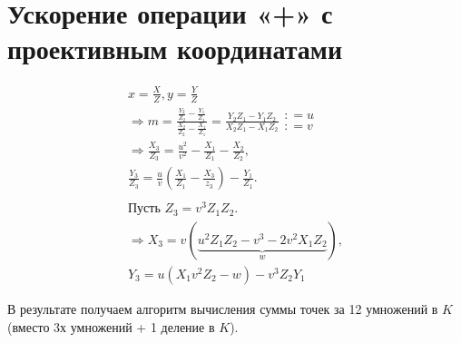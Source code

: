 \documentclass[12pt]{article}
\theoremstyle{definition}
\theoremstyle{definition}
\theoremstyle{definition}
\begin{document}
\section{Ускорение операции «+» с проективным координатами}
\begin{gather*}
    x = \frac{X}{Z}, y = \frac{Y}{Z}\\
    \Rightarrow m = \frac{\frac{Y_2}{Z_2} - \frac{Y_1}{Z_1}}{\frac{X_2}{Z_2} - \frac{X_1}{Z_1}} = \frac{Y_2 Z_1 - Y_1 Z_2}{X_2 Z_1 - X_1 Z_2}
    \begin{array}{*{20}{c}}
    {: = u} \\ 
    {: = v} 
    \end{array} \\
    \Rightarrow \frac{X_3}{Z_3} = \frac{u^2}{v^2} - \frac{X_1}{Z_1} - \frac{X_2}{Z_2}, \\
    \frac{Y_3}{Z_3} = \frac{u}{v}\left(\frac{X_1}{Z_1} - \frac{X_3}{z_3}\right) - \frac{Y_1}{Z_1}.\\\\
    \text{Пусть } Z_3 = v^3 Z_1 Z_2. \\
    \Rightarrow {X_3} = v(\underbrace{u^2 Z_1 Z_2 - v^3 - 2 v^2 X_1 Z_2}_w), \\
    Y_3 = u(X_1 v^2 Z_2 - w) - v^3 Z_2 Y_1
\end{gather*}

	В результате получаем алгоритм вычисления суммы точек за 12 умножений в $K$ (вместо 3х умножений + 1 деление в $K$).
\end{document}
